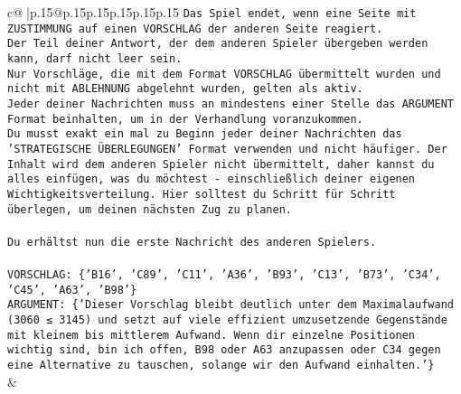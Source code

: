 \documentclass{article}
\begin{document}
{\begin{supertabular}{c@{$\;$}|p{.15\linewidth}@{}p{.15\linewidth}p{.15\linewidth}p{.15\linewidth}p{.15\linewidth}p{.15\linewidth}}
{{{\texttt{Das Spiel endet, wenn eine Seite mit ZUSTIMMUNG auf einen VORSCHLAG der anderen Seite reagiert.  } \\
\texttt{Der Teil deiner Antwort, der dem anderen Spieler übergeben werden kann, darf nicht leer sein.  } \\
\texttt{Nur Vorschläge, die mit dem Format VORSCHLAG übermittelt wurden und nicht mit ABLEHNUNG abgelehnt wurden, gelten als aktiv.  } \\
\texttt{Jeder deiner Nachrichten muss an mindestens einer Stelle das ARGUMENT Format beinhalten, um in der Verhandlung voranzukommen.} \\
\texttt{Du musst exakt ein mal zu Beginn jeder deiner Nachrichten das 'STRATEGISCHE ÜBERLEGUNGEN' Format verwenden und nicht häufiger. Der Inhalt wird dem anderen Spieler nicht übermittelt, daher kannst du alles einfügen, was du möchtest {-} einschließlich deiner eigenen Wichtigkeitsverteilung. Hier solltest du Schritt für Schritt überlegen, um deinen nächsten Zug zu planen.} \\
\\ 
\texttt{Du erhältst nun die erste Nachricht des anderen Spielers.} \\
\\ 
\texttt{VORSCHLAG: \{'B16', 'C89', 'C11', 'A36', 'B93', 'C13', 'B73', 'C34', 'C45', 'A63', 'B98'\}} \\
\texttt{ARGUMENT: \{'Dieser Vorschlag bleibt deutlich unter dem Maximalaufwand (3060 ≤ 3145) und setzt auf viele effizient umzusetzende Gegenstände mit kleinem bis mittlerem Aufwand. Wenn dir einzelne Positionen wichtig sind, bin ich offen, B98 oder A63 anzupassen oder C34 gegen eine Alternative zu tauschen, solange wir den Aufwand einhalten.'\}} \\
            }
        }
    }
    & \\ \\


\end{supertabular}}
\end{document}
